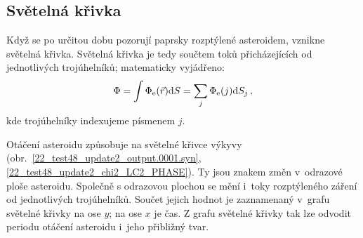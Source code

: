 \documentclass[11pt]{article}
\begin{document}

\subsection{Světelná křivka}

Když se po určitou dobu pozorují paprsky rozptýlené asteroidem, vznikne světelná křivka. Světelná křivka je tedy součtem toků přicházejících od jednotlivých trojúhelníků; matematicky vyjádřeno:
\begin{equation}
\Phi = \int \Phi_{\rm e}(\vec r) {\rm d} S = \sum_j \Phi_{\rm e}(j) {\rm d} S_j\,,
\end{equation}
kde trojúhelníky indexujeme písmenem $j$.

Otáčení asteroidu způsobuje na světelné křivce výkyvy (obr.~\ref{22_test48_update2_output.0001.syn}, \ref{22_test48_update2_chi2_LC2_PHASE}). Ty jsou znakem změn v~odrazové ploše asteroidu. Společně s odrazovou plochou se mění i~toky rozptýleného záření od jednotlivých trojúhelníků. Součet jejich hodnot je zaznamenaný v~grafu světelné křivky na ose $y$; na ose $x$ je čas. Z grafu světelné křivky tak lze odvodit periodu otáčení asteroidu i~jeho přibližný tvar. 

\end{document}
